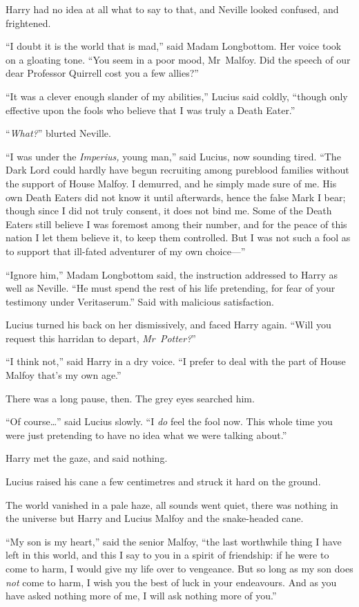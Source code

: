 Harry had no idea at all what to say to that, and Neville looked confused, and frightened.

“I doubt it is the world that is mad,” said Madam Longbottom. Her voice took on a gloating tone. “You seem in a poor mood, Mr~Malfoy. Did the speech of our dear Professor Quirrell cost you a few allies?”

“It was a clever enough slander of my abilities,” Lucius said coldly, “though only effective upon the fools who believe that I was truly a Death Eater.”

“\emph{What?}” blurted Neville.

“I was under the \emph{Imperius,} young man,” said Lucius, now sounding tired. “The Dark Lord could hardly have begun recruiting among pureblood families without the support of House Malfoy. I demurred, and he simply made sure of me. His own Death Eaters did not know it until afterwards, hence the false Mark I bear; though since I did not truly consent, it does not bind me. Some of the Death Eaters still believe I was foremost among their number, and for the peace of this nation I let them believe it, to keep them controlled. But I was not such a fool as to support that ill-fated adventurer of my own choice—”

“Ignore him,” Madam Longbottom said, the instruction addressed to Harry as well as Neville. “He must spend the rest of his life pretending, for fear of your testimony under Veritaserum.” Said with malicious satisfaction.

Lucius turned his back on her dismissively, and faced Harry again. “Will you request this harridan to depart, \emph{Mr~Potter?}”

“I think not,” said Harry in a dry voice. “I prefer to deal with the part of House Malfoy that’s my own age.”

There was a long pause, then. The grey eyes searched him.

“Of course…” said Lucius slowly. “I \emph{do} feel the fool now. This whole time you were just pretending to have no idea what we were talking about.”

Harry met the gaze, and said nothing.

Lucius raised his cane a few centimetres and struck it hard on the ground.

The world vanished in a pale haze, all sounds went quiet, there was nothing in the universe but Harry and Lucius Malfoy and the snake-headed cane.

“My son is my heart,” said the senior Malfoy, “the last worthwhile thing I have left in this world, and this I say to you in a spirit of friendship: if he were to come to harm, I would give my life over to vengeance. But so long as my son does \emph{not} come to harm, I wish you the best of luck in your endeavours. And as you have asked nothing more of me, I will ask nothing more of you.”

